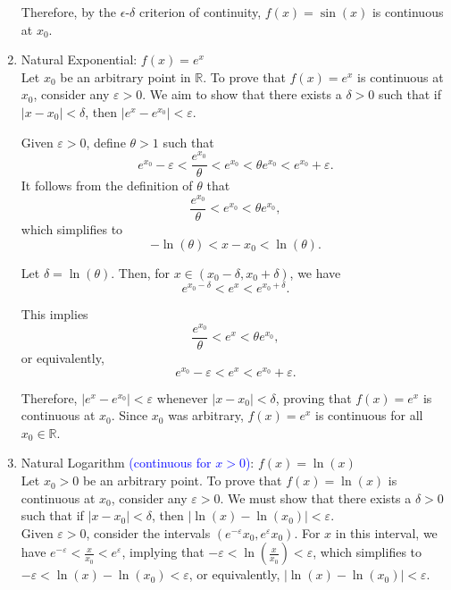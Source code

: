 \begin{enumerate}
Therefore, by the $\epsilon$-$\delta$ criterion of continuity, $f(x) = \sin(x)$ is continuous at $x_0$. 
\Qed



  \item Natural Exponential: $ f(x) = e^x $\\

Let $x_0$ be an arbitrary point in $\mathbb{R}$. To prove that $f(x) = e^x$ is continuous at $x_0$, consider any $\varepsilon > 0$. We aim to show that there exists a $\delta > 0$ such that if $|x - x_0| < \delta$, then $|e^x - e^{x_0}| < \varepsilon$.

Given $\varepsilon > 0$, define $\theta > 1$ such that
\[
e^{x_0} - \varepsilon < \frac{e^{x_0}}{\theta} < e^{x_0} < \theta e^{x_0} < e^{x_0} + \varepsilon.
\]
It follows from the definition of $\theta$ that
\[
\frac{e^{x_0}}{\theta} < e^{x_0} < \theta e^{x_0},
\]
which simplifies to
\[
-\ln(\theta) < x - x_0 < \ln(\theta).
\]

Let $\delta = \ln(\theta)$. Then, for $x \in (x_0 - \delta, x_0 + \delta)$, we have
\[
e^{x_0 - \delta} < e^x < e^{x_0 + \delta}.
\]

This implies
\[
\frac{e^{x_0}}{\theta} < e^x < \theta e^{x_0},
\]
or equivalently,
\[
e^{x_0} - \varepsilon < e^x < e^{x_0} + \varepsilon.
\]

Therefore, $|e^x - e^{x_0}| < \varepsilon$ whenever $|x - x_0| < \delta$, proving that $f(x) = e^x$ is continuous at $x_0$. Since $x_0$ was arbitrary, $f(x) = e^x$ is continuous for all $x_0 \in \mathbb{R}$. 
\Qed


  \item Natural Logarithm \textcolor{blue}{(continuous for $ x > 0 $)}: $ f(x) = \ln(x) $\\

Let $x_0 > 0$ be an arbitrary point. To prove that $f(x) = \ln(x)$ is continuous at $x_0$, consider any $\varepsilon > 0$. We must show that there exists a $\delta > 0$ such that if $|x - x_0| < \delta$, then $|\ln(x) - \ln(x_0)| < \varepsilon$.\\

Given $\varepsilon > 0$, consider the intervals $(e^{-\varepsilon}x_0, e^{\varepsilon}x_0)$. For $x$ in this interval, we have $e^{-\varepsilon} < \frac{x}{x_0} < e^{\varepsilon}$, implying that $-\varepsilon < \ln\left(\frac{x}{x_0}\right) < \varepsilon$, which simplifies to $-\varepsilon < \ln(x) - \ln(x_0) < \varepsilon$, or equivalently, $|\ln(x) - \ln(x_0)| < \varepsilon$.\\


\end{enumerate}
